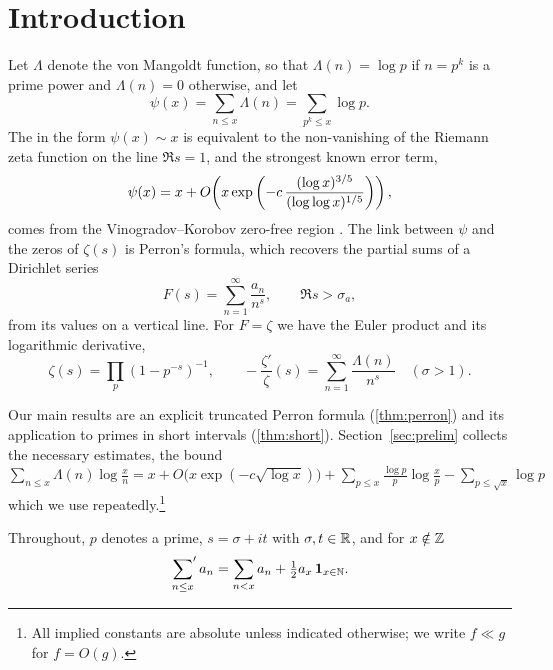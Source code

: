 \section{Introduction}\label{sec:intro}

Let $\Lambda$ denote the von Mangoldt function, so that $\Lambda(n)=\log p$ if $n=p^k$ is a
prime power and $\Lambda(n)=0$ otherwise, and let
\begin{equation}\label{eq:psi}
\psi(x) = \sum_{n\le x}\Lambda(n) = \sum_{p^k\le x}\log p .
\end{equation}
The \PNT{} in the form $\psi(x)\sim x$ is equivalent to the non-vanishing of the Riemann
zeta function on the line $\Re s=1$, and the strongest known error term,
\begin{equation}\label{eq:pnt}
\psi(x) = x + O\!\left(x\exp\left(-c\,\frac{(\log x)^{3/5}}{(\log\log x)^{1/5}}\right)\right),
\end{equation}
comes from the Vinogradov--Korobov zero-free region \cite{Korobov,Vinogradov}. The link between
$\psi$ and the zeros of $\zeta(s)$ is Perron's formula, which recovers the partial sums of a
Dirichlet series
\[
F(s)=\sum_{n=1}^{\infty}\frac{a_n}{n^{s}}, \qquad \Re s > \sigma_a,
\]
from its values on a vertical line. For $F=\zeta$ we have the Euler product and its logarithmic
derivative,
\begin{equation}\label{eq:euler}
\zeta(s)=\prod_{p}\left(1-p^{-s}\right)^{-1}, \qquad
-\frac{\zeta'}{\zeta}(s)=\sum_{n=1}^\infty\frac{\Lambda(n)}{n^s}\quad(\sigma>1).
\end{equation}

Our main results are an explicit truncated Perron formula (\cref{thm:perron}) and its application
to primes in short intervals (\cref{thm:short}). Section~\ref{sec:prelim} collects the necessary
estimates, \eg the bound
$\sum_{n\le x}\Lambda(n)\log\frac{x}{n} = x + O\bigl(x\exp(-c\sqrt{\log x})\bigr) + \sum_{p\le x}\frac{\log p}{p}\log\frac{x}{p} - \sum_{p\le \sqrt{x}}\log p$
which we use repeatedly.\footnote{All implied constants are absolute unless indicated otherwise;
we write $f\ll g$ for $f=O(g)$.}

\begin{notation}
Throughout, $p$ denotes a prime, $s=\sigma+it$ with $\sigma,t\in\mathbb{R}$, and for $x\notin\mathbb{Z}$
\[
\sideset{}{'}\sum_{n\le x} a_n = \sum_{n<x}a_n + \tfrac12 a_x \,\mathbf{1}_{x\in\mathbb{N}}.
\]
\end{notation}
